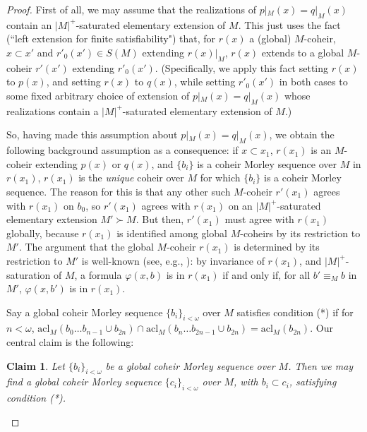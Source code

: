 \documentclass{amsart}
\newtheorem{claim}[theorem]{Claim}
\theoremstyle{definition}
\theoremstyle{remark}
\numberwithin{equation}{section}
\begin{document}
\begin{proof}
    First of all, we may assume that the realizations of $p|_{M}(x)=q|_{M}(x)$ contain an $|M|^{+}$-saturated elementary extension of $M$. This just uses the fact (``left extension for finite satisfiability") that, for $r(x)$ a (global) $M$-coheir, $x \subset x'$ and $r'_{0}(x') \in S(M)$ extending $r(x)|_{M}$, $r(x)$ extends to a global $M$-coheir $r'(x')$ extending $r'_{0}(x')$. (Specifically, we apply this fact setting $r(x)$ to $p(x)$, and setting $r(x)$ to $q(x)$, while setting $r'_{0}(x')$ in both cases to some fixed arbitrary choice of extension of $p|_{M}(x)=q|_{M}(x)$ whose realizations contain a $|M|^{+}$-saturated elementary extension of $M$.)
    
    So, having made this assumption about $p|_{M}(x)=q|_{M}(x)$, we obtain the following background assumption as a consequence: if $x \subset x_{1}$, $r(x_{1})$ is an $M$-coheir extending $p(x)$ or $q(x)$, and $\{b_{i}\}$ is a coheir Morley sequence over $M$ in $r(x_{1})$, $r(x_{1})$ is the \textit{unique} coheir over $M$ for which $\{b_{i}\}$ is a coheir Morley sequence. The reason for this is that any other such $M$-coheir $r'(x_{1})$ agrees with $r(x_{1})$ on $b_{0}$, so $r'(x_{1})$ agrees with $r(x_{1})$ on an $|M|^{+}$-saturated elementary extension $M' \succ M$. But then, $r'(x_{1})$ must agree with $r(x_{1})$ globally, because $r(x_{1})$ is identified among global $M$-coheirs by its restriction to $M'$. The argument that the global $M$-coheir $r(x_{1})$ is determined by its restriction to $M'$ is well-known (see, e.g., \cite{sim12}): by invariance of $r(x_{1})$, and $|M|^{+}$-saturation of $M$,  a formula $\varphi(x, b)$ is in $r(x_{1})$ if and only if, for all $b' \equiv_{M} b$ in $M'$, $\varphi(x, b')$ is in $r(x_1)$.

      Say a global coheir Morley sequence $\{b_{i}\}_{i < \omega}$ over $M$ satisfies condition (*) if for $n < \omega$, $\mathrm{acl}_{M}(b_{0} \ldots b_{n-1} \cup b_{2n}) \cap \mathrm{acl}_{M}(b_{n} \ldots b_{2n-1} \cup b_{2n})=\mathrm{acl}_{M}(b_{2n})$. Our central claim is the following:


    \begin{claim}
\label{extending to sequence satisfying condition *}        Let $\{b_{i}\}_{i< \omega}$ be a global coheir Morley sequence over $M$. Then we may find a global coheir Morley sequence $\{c_{i}\}_{i < \omega}$ over $M$, with $b_{i} \subset c_{i}$, satisfying condition (*).
    \end{claim}


\end{proof}
\end{document}
